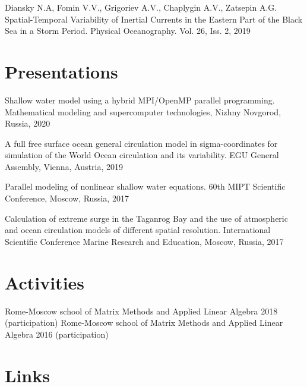 \documentclass[10pt,a4paper]{moderncv}
\begin{document}
\cvlistitem
{Diansky N.A, Fomin V.V., Grigoriev A.V., Chaplygin A.V., Zatsepin A.G. Spatial-Temporal Variability of Inertial Currents in the Eastern Part of the Black Sea in a Storm Period. Physical Oceanography. Vol. 26, Iss. 2, 2019}

\section{Presentations}

\cvlistitem
{Shallow water model using a hybrid MPI/OpenMP parallel programming. Mathematical modeling and supercomputer technologies, Nizhny Novgorod, Russia, 2020}

\cvlistitem
{A full free surface ocean general circulation model in sigma-coordinates for simulation of the World Ocean circulation and its variability. EGU General Assembly, Vienna, Austria, 2019} 

\cvlistitem
{Parallel modeling of nonlinear shallow water equations. 60th MIPT Scientific Conference, Moscow, Russia, 2017}

\cvlistitem
{Calculation of extreme surge in the Taganrog Bay and the use of atmospheric and ocean circulation models of different spatial resolution. International Scientific Conference Marine Research and Education, Moscow, Russia, 2017}

\section{Activities}
\cvlistitem
{Rome-Moscow school of Matrix Methods and Applied Linear Algebra 2018 (participation)}
\cvlistitem
{Rome-Moscow school of Matrix Methods and Applied Linear Algebra 2016 (participation)}

\section{Links}
\end{document}
